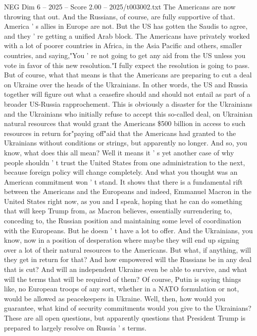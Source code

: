 \begin{textsample}{NEG Dim 6 – 2025 – Score 2.00 – 2025/t003002.txt}
The Americans are now throwing that out.
And the Russians, of course, are fully supportive of that.
America ' s allies in Europe are not.
But the US has gotten the Saudis to agree, and they ' re getting a unified Arab block.
The Americans have privately worked with a lot of poorer countries in Africa, in the Asia Pacific and others, smaller countries, and saying,"You ' re not going to get any aid from the US unless you vote in favor of this new resolution."I fully expect the resolution is going to pass.
But of course, what that means is that the Americans are preparing to cut a deal on Ukraine over the heads of the Ukrainians.
In other words, the US and Russia together will figure out what a ceasefire should and should not entail as part of a broader US-Russia rapprochement.
This is obviously a disaster for the Ukrainians and the Ukrainians who initially refuse to accept this so-called deal, on Ukrainian natural resources that would grant the Americans \$500 billion in access to such resources in return for"paying off"aid that the Americans had granted to the Ukrainians without conditions or strings, but apparently no longer.
And so, you know, what does this all mean?
Well it means it ' s yet another case of why people shouldn ' t trust the United States from one administration to the next, because foreign policy will change completely.
And what you thought was an American commitment won ' t stand.
It shows that there is a fundamental rift between the Americans and the Europeans and indeed, Emmanuel Macron in the United States right now, as you and I speak, hoping that he can do something that will keep Trump from, as Macron believes, essentially surrendering to, conceding to, the Russian position and maintaining some level of coordination with the Europeans.
But he doesn ' t have a lot to offer.
And the Ukrainians, you know, now in a position of desperation where maybe they will end up signing over a lot of their natural resources to the Americans.
But what, if anything, will they get in return for that?
And how empowered will the Russians be in any deal that is cut?
And will an independent Ukraine even be able to survive, and what will the terms that will be required of them?
Of course, Putin is saying things like, no European troops of any sort, whether in a NATO formulation or not, would be allowed as peacekeepers in Ukraine.
Well, then, how would you guarantee, what kind of security commitments would you give to the Ukrainians?
These are all open questions, but apparently questions that President Trump is prepared to largely resolve on Russia ' s terms.

\end{textsample}

